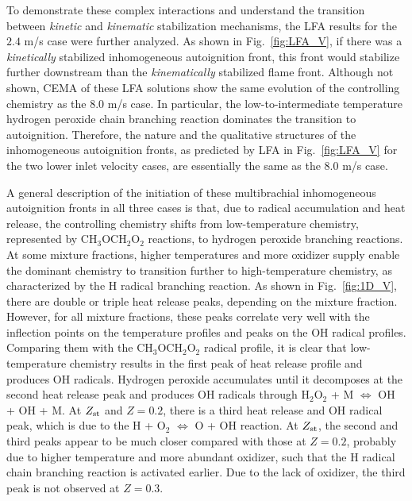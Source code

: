To demonstrate these complex interactions and understand the transition between \emph{kinetic} and \emph{kinematic} stabilization mechanisms, the LFA results for the $2.4$ m/s case were further analyzed.  As shown in Fig.~\ref{fig:LFA_V}, if there was a \emph{kinetically} stabilized inhomogeneous autoignition front, this front would stabilize further downstream than the \emph{kinematically} stabilized flame front.  Although not shown, CEMA of these LFA solutions show the same evolution of the controlling chemistry as the $8.0$ m/s case.  In particular, the low-to-intermediate temperature hydrogen peroxide chain branching reaction dominates the transition to autoignition.  Therefore, the nature and the qualitative structures of the inhomogeneous autoignition fronts, as predicted by LFA in Fig.~\ref{fig:LFA_V} for the two lower inlet velocity cases, are essentially the same as the $8.0$ m/s case.  

A general description of the initiation of these multibrachial inhomogeneous autoignition fronts in all three cases is that, due to radical accumulation and heat release, the controlling chemistry shifts from low-temperature chemistry, represented by CH$_3$OCH$_2$O$_2$ reactions, to hydrogen peroxide branching reactions.  At some mixture fractions, higher temperatures and more oxidizer supply enable the dominant chemistry to transition further to high-temperature chemistry, as characterized by the H radical branching reaction.  As shown in Fig.~\ref{fig:1D_V}, there are double or triple heat release peaks, depending on the mixture fraction.  However, for all mixture fractions, these peaks correlate very well with the inflection points on the temperature profiles and peaks on the OH radical profiles.  Comparing them with the CH$_3$OCH$_2$O$_2$ radical profile, it is clear that low-temperature chemistry results in the first peak of heat release profile and produces OH radicals.  Hydrogen peroxide accumulates until it decomposes at the second heat release peak and produces OH radicals through H$_2$O$_2$ + M $\Longleftrightarrow$ OH + OH + M.  At $Z_{\rm st}$ and $Z = 0.2$, there is a third heat release and OH radical peak, which is due to the H + O$_2$ $\Longleftrightarrow$ O + OH reaction.  At $Z_{\rm st}$, the second and third peaks appear to be much closer compared with those at $Z = 0.2$, probably due to higher temperature and more abundant oxidizer, such that the H radical chain branching reaction is activated earlier.  Due to the lack of oxidizer, the third peak is not observed at $Z = 0.3$.  

